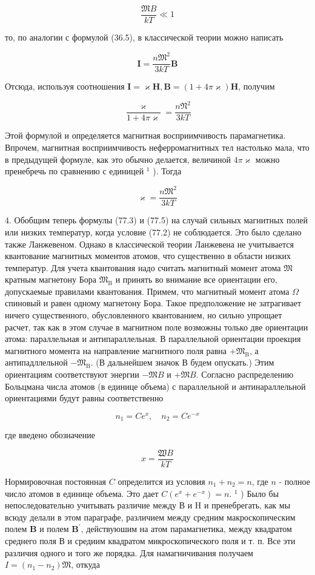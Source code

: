 \documentclass[12pt]{article}
\begin{document}
  $$
  \frac{\mathfrak{M} B}{k T} \ll 1
  $$

  то, по аналогии с формулой (36.5), в классической теории можно написать

  $$
  \mathbf{I}=\frac{n \mathfrak{M}^2}{3 k T} \mathbf{B}
  $$


  Отсюда, используя соотношения $\mathbf{I}=\varkappa \mathbf{H}, \mathbf{B}=(1+4 \pi \varkappa) \mathbf{H}$, получим

  $$
  \frac{\varkappa}{1+4 \pi \varkappa}=\frac{n \mathfrak{N}^2}{3 k T}
  $$


  Этой формулой и определяется магнитная восприимчивость парамагнетика. Впрочем, магнитная восприимчивость неферромагнитных тел настолько мала, что в предыдущей формуле, как это обычно делается, величиной $4 \pi \varkappa$ можно пренебречь по сравнению с единицей ${ }^1$ ). Тогда

  $$
  \varkappa=\frac{n \mathfrak{M}^2}{3 k T}
  $$

  4. Обобщим теперь формулы (77.3) и (77.5) на случай сильных магнитных полей или низких температур, когда условие (77.2) не соблюдается. Это было сделано также Ланжевеном. Однако в классической теории Ланжевена не учитывается квантование магнитных моментов атомов, что существенно в области низких температур. Для учета квантования надо считать магнитный момент атома $\mathfrak{M}$ кратным магнетону Бора $\mathfrak{M}_{\mathrm{B}}$ и принять во внимание все ориентации его, допускаемые правилами квантования. Примем, что магнитный момент атома $\mathfrak{\Omega}$ спиновый и равен одному магнетону Бора. Такое предположение не затрагивает ничего существенного, обусловленного квантованием, но сильно упрощает расчет, так как в этом случае в магнитном поле возможны только две ориентации атома: параллельная и антипараллельная. В параллельной ориентации проекция магнитного момента на направление магнитного поля равна $+\mathfrak{M}_{\mathrm{B}}$, а антипадллельной $-\mathfrak{M}_{\mathrm{B}}$. (В дальнейшем значок В будем опускать.) Этим ориентациям соответствуют энергии $-\mathfrak{M} B$ и $+\mathfrak{M} B$. Согласно распределению Больцмана числа атомов (в единице объема) с параллельной и антинараллельной
  ориентациями будут равны соответственно

  $$
  n_1=C e^x, \quad n_2=C e^{-x}
  $$


  где введено обозначение

  $$
  x=\frac{\mathfrak{W} B}{k T}
  $$


  Нормировочная постоянная $C$ определится из условия $n_1+n_2=n$, где $n$ - полное число атомов в единице объема. Это дает $C\left(e^x+e^{-x}\right)=n$.
  ${ }^1$ ) Было бы непоследовательно учитывать различие между В и H и пренебрегать, как мы всюду делали в этом параграфе, различием между средним макроскопическим полем $\mathbf{B}$ и полем $\mathbf{B}^{\prime}$, действуюшим на атом парамагнетика, между квадратом среднего поля В и средиим квадратом микроскопического поля и т. п. Все эти различия одного и того же порядка.
  Для намагничивания получаем $I=\left(n_1-n_2\right)\mathfrak{M}$, откуда
\end{document}
